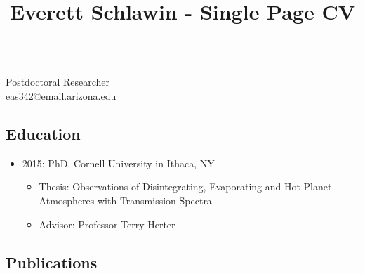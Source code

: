 \documentclass[11pt, oneside]{article}   	%
\title{Everett Schlawin - Single Page CV}
\date{}							%
\begin{document}
\maketitle
\vspace{-0.85in}
\begin{centering}
\rule{6in}{0.03in}
Postdoctoral Researcher\\
eas342@email.arizona.edu

\end{centering}

\subsection*{Education}
\begin{itemize}[noitemsep]
	\item 2015: PhD, Cornell University in Ithaca, NY
		\begin{itemize}[noitemsep]
		\item Thesis: Observations of Disintegrating, Evaporating and Hot Planet Atmospheres with Transmission Spectra
		\item Advisor: Professor Terry Herter
		\end{itemize}
\end{itemize}


\vspace{-0.2in}
\subsection*{Publications}
\nocite{schlawin2018JWSTforecasts}
\nocite{schlawin2014}
\nocite{schlawin2017dhs}
\nocite{schlawin2017bdVar}
\nocite{schlawin2016kic1255}

\begingroup
\renewcommand{\section}[2]{}%


\endgroup
\end{document}
